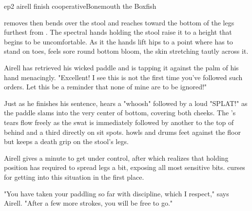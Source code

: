 \documentclass{book}
\begin{document}
\begin{childnode}{ep2 airell finish cooperative}{Bonemouth the Boxfish}

    \HeShe{} 
    removes \hisher{} \trousers{}
    then bends over the stool and reaches toward the bottom of the legs furthest from \himher{}. The spectral hands holding the stool raise it to a height that begins to be uncomfortable. As it 
    the hands lift \hisher{} hips to a point where \heshe{} has to stand on \hisher{} toes, \heshe{} feels \hisher{} sore round bottom bloom, the skin stretching tautly across it. 



Airell has retrieved his wicked paddle and is tapping it against the palm of his hand menacingly. "Excellent! I see this is not the first time you've followed such orders. Let this be a reminder 
that none of mine are to be ignored!" 

Just as he finishes his sentence, \name{} hears a "whoosh" followed by a loud "SPLAT!" as the paddle slams into the very center of \hisher{} bottom, covering both cheeks. The \boygirl{}'s tears flow 
freely as the swat is immediately followed by another to the top of \hisher{} behind and a third directly on \hisher{} sit spots. \name{} howls and drums \hisher{} feet against the floor but keeps a 
death grip on the stool's legs. 

Airell gives \name{} a minute to get \himselfherself{} under control, after which \heshe{} realizes that holding \hisher{} position has required \himher{} to spread \hisher{} legs a bit, exposing
all \hisher{} most sensitive bits. \HeShe{} curses \himselfherself{} for getting into this situation in the first place.

"You have taken your paddling so far with discipline, which I respect," says Airell. "After a few more strokes, you will be free to go."


\end{childnode}
\end{document}
